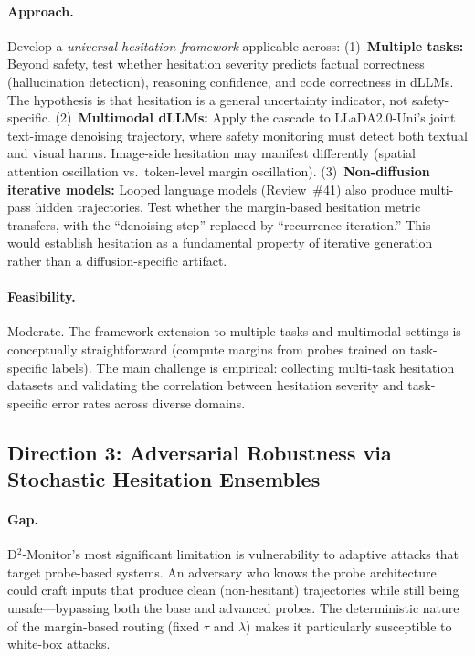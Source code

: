 \documentclass[11pt,a4paper]{article}
\begin{document}
\paragraph{Approach.}
Develop a \emph{universal hesitation framework} applicable across: (1)~\textbf{Multiple tasks:} Beyond safety, test whether hesitation severity predicts factual correctness (hallucination detection), reasoning confidence, and code correctness in dLLMs. The hypothesis is that hesitation is a general uncertainty indicator, not safety-specific. (2)~\textbf{Multimodal dLLMs:} Apply the cascade to LLaDA2.0-Uni's joint text-image denoising trajectory, where safety monitoring must detect both textual and visual harms. Image-side hesitation may manifest differently (spatial attention oscillation vs.\ token-level margin oscillation). (3)~\textbf{Non-diffusion iterative models:} Looped language models (Review~\#41) also produce multi-pass hidden trajectories. Test whether the margin-based hesitation metric transfers, with the ``denoising step'' replaced by ``recurrence iteration.'' This would establish hesitation as a fundamental property of iterative generation rather than a diffusion-specific artifact.

\paragraph{Feasibility.}
Moderate. The framework extension to multiple tasks and multimodal settings is conceptually straightforward (compute margins from probes trained on task-specific labels). The main challenge is empirical: collecting multi-task hesitation datasets and validating the correlation between hesitation severity and task-specific error rates across diverse domains.

\subsection*{Direction 3: Adversarial Robustness via Stochastic Hesitation Ensembles}

\paragraph{Gap.}
D$^2$-Monitor's most significant limitation is vulnerability to adaptive attacks that target probe-based systems. An adversary who knows the probe architecture could craft inputs that produce clean (non-hesitant) trajectories while still being unsafe---bypassing both the base and advanced probes. The deterministic nature of the margin-based routing (fixed $\tau$ and $\lambda$) makes it particularly susceptible to white-box attacks.
\end{document}
